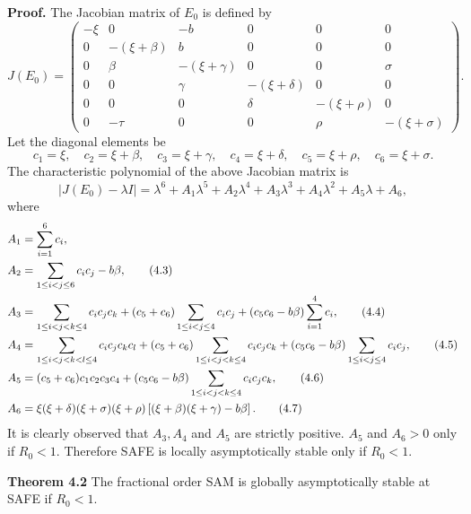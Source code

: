 \documentclass[10pt]{NSP1}
\begin{document}
	\textbf{Proof.} The Jacobian matrix of $E_0$ is defined by
	\begin{equation}
		J(E_0) = \begin{pmatrix}
			-\xi & 0 & -b & 0 & 0 & 0 \\
			0 & -(\xi + \beta) & b & 0 & 0 & 0 \\
			0 & \beta & -(\xi + \gamma) & 0 & 0 & \sigma \\
			0 & 0 & \gamma & -(\xi + \delta) & 0 & 0 \\
			0 & 0 & 0 & \delta & -(\xi + \rho) & 0 \\
			0 & -\tau & 0 & 0 & \rho & -(\xi + \sigma)
		\end{pmatrix}.
		\tag{4.1}
	\end{equation}
	Let the diagonal elements be
	\begin{equation*}
		c_1 = \xi,\quad c_2 = \xi + \beta,\quad c_3 = \xi + \gamma,\quad c_4 = \xi + \delta,\quad c_5 = \xi + \rho,\quad c_6 = \xi + \sigma.
	\end{equation*}
	The characteristic polynomial of the above Jacobian matrix is
	\begin{equation}
		\left| J(E_0) - \lambda I \right| = \lambda^6 + A_1 \lambda^5 + A_2 \lambda^4 + A_3 \lambda^3 + A_4 \lambda^2 + A_5 \lambda + A_6,
		\tag{4.2}
	\end{equation}
	where
	\begin{align}
		A_1 &= \sum_{i=1}^6 c_i, \notag \\
		A_2 &= \sum_{1 \le i < j \le 6} c_i c_j - b\beta, \tag{4.3} \\
		A_3 &= \sum_{1 \le i < j < k \le 4} c_i c_j c_k + (c_5 + c_6) \sum_{1 \le i < j \le 4} c_i c_j + (c_5 c_6 - b\beta) \sum_{i=1}^4 c_i, \tag{4.4} \\
		A_4 &= \sum_{1 \le i < j < k < l \le 4} c_i c_j c_k c_l + (c_5 + c_6) \sum_{1 \le i < j < k \le 4} c_i c_j c_k + (c_5 c_6 - b\beta) \sum_{1 \le i < j \le 4} c_i c_j, \tag{4.5} \\
		A_5 &= (c_5 + c_6) c_1 c_2 c_3 c_4 + (c_5 c_6 - b\beta) \sum_{1 \le i < j < k \le 4} c_i c_j c_k, \tag{4.6} \\
		A_6 &= \xi (\xi + \delta)(\xi + \sigma)(\xi + \rho) \left[ (\xi + \beta)(\xi + \gamma) - b\beta \right]. \tag{4.7}
	\end{align}
	It is clearly observed that $A_3, A_4$ and $A_5$ are strictly positive. $A_5$ and $A_6 > 0$ only if $R_0 < 1$. Therefore SAFE is locally asymptotically stable only if $R_0 < 1$.
	
	\textbf{Theorem 4.2} The fractional order SAM is globally asymptotically stable at SAFE if $R_0 < 1$.
	
\end{document}
